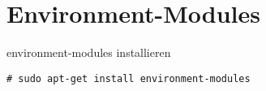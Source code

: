 \chapter{Environment-Modules}
environment-modules installieren
\begin{lstlisting}[style=Bash]
# sudo apt-get install environment-modules
\end{lstlisting}
